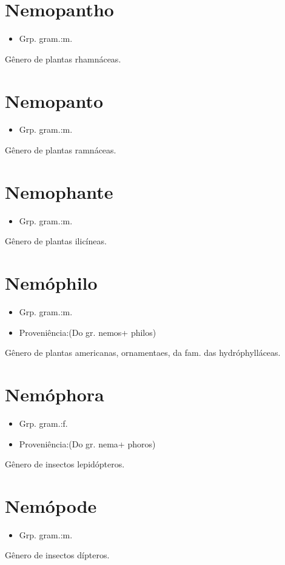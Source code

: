 \section{Nemopantho}
\begin{itemize}
\item {Grp. gram.:m.}
\end{itemize}
Gênero de plantas rhamnáceas.
\section{Nemopanto}
\begin{itemize}
\item {Grp. gram.:m.}
\end{itemize}
Gênero de plantas ramnáceas.
\section{Nemophante}
\begin{itemize}
\item {Grp. gram.:m.}
\end{itemize}
Gênero de plantas ilicíneas.
\section{Nemóphilo}
\begin{itemize}
\item {Grp. gram.:m.}
\end{itemize}
\begin{itemize}
\item {Proveniência:(Do gr. \textunderscore nemos\textunderscore  + \textunderscore philos\textunderscore )}
\end{itemize}
Gênero de plantas americanas, ornamentaes, da fam. das hydróphylláceas.
\section{Nemóphora}
\begin{itemize}
\item {Grp. gram.:f.}
\end{itemize}
\begin{itemize}
\item {Proveniência:(Do gr. \textunderscore nema\textunderscore  + \textunderscore phoros\textunderscore )}
\end{itemize}
Gênero de insectos lepidópteros.
\section{Nemópode}
\begin{itemize}
\item {Grp. gram.:m.}
\end{itemize}
Gênero de insectos dípteros.
